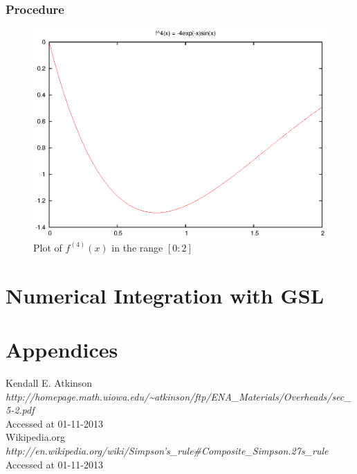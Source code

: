 \documentclass[pdf,color]{UoBnote}
\begin{document}
			\subsubsection{Procedure}
				
				\begin{figure}[tb]
					\centering
						\includegraphics{figures/q2-f4x-simps.eps}
					\caption{Plot of $f^{\left(4\right)}(x)$ in the range $[0:2]$}
					\label{fig:q2-f4x-simps}
				\end{figure}
				
				
\section{Numerical Integration with GSL}

\section{Appendices}

\begin{thebibliography}{breitestes Label}
	 Kendall E. Atkinson\\{\em http://homepage.math.uiowa.edu/\textasciitilde{}atkinson/ftp/ENA\_Materials/Overheads/sec\_5-2.pdf}\\Accessed at 01-11-2013\\
	 Wikipedia.org\\{\em http://en.wikipedia.org/wiki/Simpson's\_rule\#Composite\_Simpson.27s\_rule}\\Accessed at 01-11-2013
\end{thebibliography}
\end{document}
